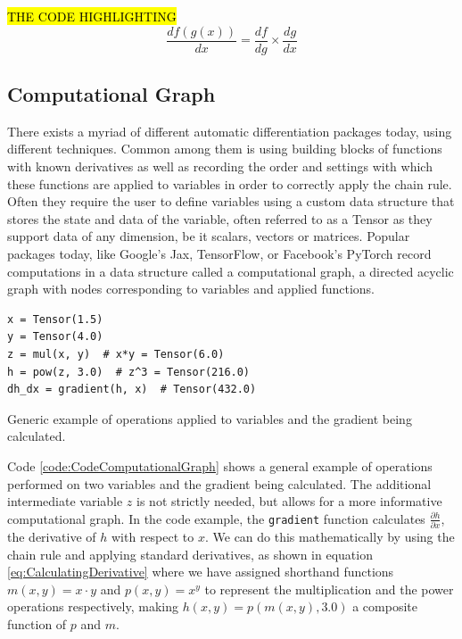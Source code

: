 \hl{THE CODE HIGHLIGHTING}
\begin{equation}\label{eq:ChainRule}
    \frac{d f(g(x))}{dx} = \frac{d f}{dg} \times \frac{d g}{d x}
\end{equation}

\subsection{Computational Graph}\label{sec:ComputationalGraph}

There exists a myriad of different automatic differentiation packages today, using different techniques. Common among them is using building blocks of functions with known derivatives as well as recording the order and settings with which these functions are applied to variables in order to correctly apply the chain rule. Often they require the user to define variables using a custom data structure that stores the state and data of the variable, often referred to as a Tensor as they support data of any dimension, be it scalars, vectors or matrices. Popular packages today, like Google's Jax, TensorFlow, or Facebook's PyTorch record computations in a data structure called a computational graph, a directed acyclic graph with nodes corresponding to variables and applied functions.

\begin{codefig}
\begin{verbatim}
x = Tensor(1.5)
y = Tensor(4.0)
z = mul(x, y)  # x*y = Tensor(6.0)
h = pow(z, 3.0)  # z^3 = Tensor(216.0)
dh_dx = gradient(h, x)  # Tensor(432.0)
\end{verbatim}
    \caption{Generic example of operations applied to variables and the gradient being calculated.}
    \label{code:CodeComputationalGraph}
\end{codefig}

Code \ref{code:CodeComputationalGraph} shows a general example of operations performed on two variables and the gradient being calculated. The additional intermediate variable $z$ is not strictly needed, but allows for a more informative computational graph. In the code example, the \texttt{gradient} function calculates $\frac{\partial h}{\partial x}$, the derivative of $h$ with respect to $x$. We can do this mathematically by using the chain rule and applying standard derivatives, as shown in equation \ref{eq:CalculatingDerivative} where we have assigned shorthand functions $m(x,y)=x\cdot y$ and $p(x,y)=x^y$ to represent the multiplication and the power operations respectively, making $h(x,y)=p(m(x,y),3.0)$ a composite function of $p$ and $m$.

